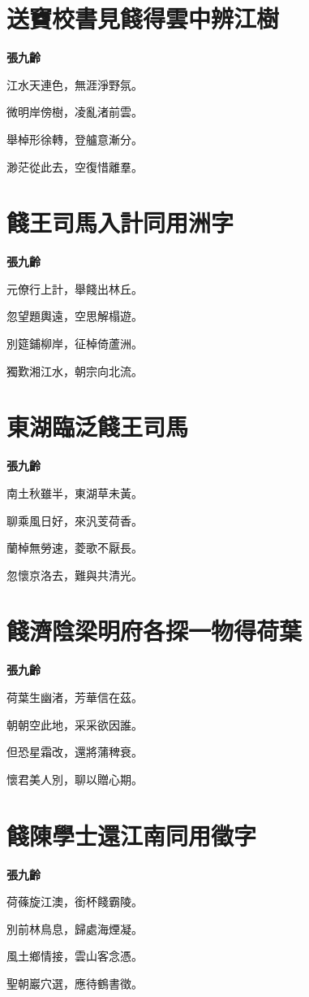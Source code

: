 \documentclass[12pt,a4paper]{ctexbook}
\begin{document}
\section{送竇校書見餞得雲中辨江樹}
\textbf{張九齡}\par\vspace{0.5em}
江水天連色，無涯淨野氛。\par
微明岸傍樹，凌亂渚前雲。\par
舉棹形徐轉，登艫意漸分。\par
渺茫從此去，空復惜離羣。\par

\section{餞王司馬入計同用洲字}
\textbf{張九齡}\par\vspace{0.5em}
元僚行上計，舉餞出林丘。\par
忽望題輿遠，空思解榻遊。\par
別筵鋪柳岸，征棹倚蘆洲。\par
獨歎湘江水，朝宗向北流。\par

\section{東湖臨泛餞王司馬}
\textbf{張九齡}\par\vspace{0.5em}
南土秋雖半，東湖草未黃。\par
聊乘風日好，來汎芰荷香。\par
蘭棹無勞速，菱歌不厭長。\par
忽懷京洛去，難與共清光。\par

\section{餞濟陰梁明府各探一物得荷葉}
\textbf{張九齡}\par\vspace{0.5em}
荷葉生幽渚，芳華信在茲。\par
朝朝空此地，采采欲因誰。\par
但恐星霜改，還將蒲稗衰。\par
懷君美人別，聊以贈心期。\par

\section{餞陳學士還江南同用徵字}
\textbf{張九齡}\par\vspace{0.5em}
荷蓧旋江澳，銜杯餞霸陵。\par
別前林鳥息，歸處海煙凝。\par
風土鄉情接，雲山客念憑。\par
聖朝巖穴選，應待鶴書徵。\par
\end{document}
